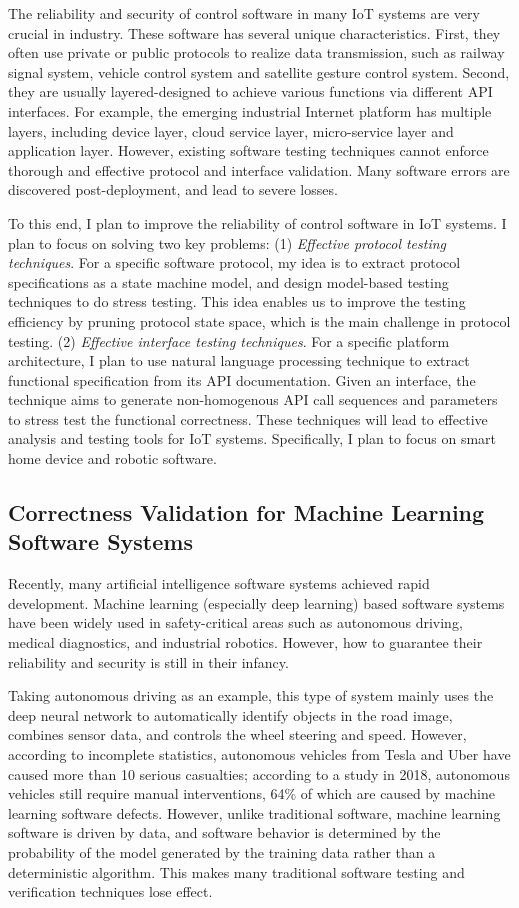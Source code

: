 \documentclass[a4paper]{article}
\begin{document}
The reliability and security of control software in many IoT systems are very crucial in industry.
These software has several unique characteristics. 
First, they often use private or public protocols to realize data transmission, such as railway signal system, vehicle control system and satellite gesture control system. 
Second, they are usually layered-designed to achieve various functions via different API interfaces.
For example, the emerging industrial Internet platform has multiple layers, including device layer, cloud service layer, micro-service layer and application layer. 
However, existing software testing techniques cannot enforce thorough and effective protocol and interface validation. Many software errors are discovered post-deployment, and lead to severe losses. 

To this end, I plan to improve the reliability of control software in
IoT systems. I plan to focus on solving two key problems: 
(1) \emph{Effective protocol testing techniques}. 
For a specific software protocol, my idea is to extract protocol specifications as a state machine model, and design model-based testing techniques to do stress testing. 
This idea enables us to improve the testing efficiency by pruning protocol state space,
which is the main challenge in protocol testing.
(2) \emph{Effective interface testing techniques}.
For a specific platform architecture, I plan to use natural language processing technique to extract functional specification from its API documentation. 
Given an interface, the technique aims to generate non-homogenous API call sequences and parameters to stress test the functional correctness.
These techniques will lead to effective analysis and testing tools for IoT systems. Specifically, I plan to focus on smart home device and robotic software.

\subsection{Correctness Validation for Machine Learning Software Systems}

Recently, many artificial intelligence software systems achieved rapid development. Machine learning (especially deep learning) based software systems have been widely used in safety-critical areas such as autonomous driving, medical diagnostics, and industrial robotics. However, how to guarantee their reliability and security is still in their infancy. 

Taking autonomous driving as an example, this type of system mainly uses the deep neural network to automatically identify objects in the road image, combines sensor data, and controls the wheel steering and speed. However, according to incomplete statistics,
autonomous vehicles from Tesla and Uber have caused more than 10 serious casualties; 
according to a study in 2018, autonomous vehicles still require manual interventions, 64\% of which are caused by machine learning software defects.
However, unlike traditional software, machine learning software is driven by data, and software behavior is determined by the probability of the model generated by the training data rather than
a deterministic algorithm. This makes many traditional software testing and verification techniques lose effect.
\end{document}

